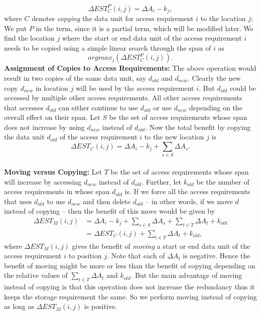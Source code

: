 \[ 
\Delta EST_C^P(i,j) = \Delta A_i - k_j, 
\]
where $C$ denotes {\it copying} the data unit for access requirement $i$ to the location $j$; We put $P$ in the term, since it is a partial term, which will be modified later. We find the location $j$ where the start or end data unit of the access requirement $i$ needs to be copied  using a simple linear search through the span of $i$ as
\[
argmax_j(\Delta EST_C^P(i,j)).
\]
{\bf Assignment of Copies to Access Requirements:} The above operation would
result in two copies of the same data unit, say $d_{old}$ and $d_{new}$.
Clearly the new copy $d_{new}$ in location $j$ will be used by the access
requirement $i$.  But $d_{old}$ could be accessed by multiple other access
requirements. All other access requirements that accesses $d_{old}$ can either
continue to use $d_{old}$ or use $d_{new}$ depending on the overall effect on
their span. Let $S$ be the set of access requirements whose span does not
increase by using $d_{new}$ instead of $d_{old}$. Now the total benefit by
copying the data unit $d_{old}$ of the access requirement $i$ to the new
location $j$ is
\begin{equation}
\Delta EST_C(i,j) = \Delta A_i - k_j + \sum_{s\in S}\Delta{A_s}.
\label{eq:copyingcost}
\end{equation}
\\
{\bf Moving versus Copying:} Let $T$ be the set of access requirements whose
span will increase by accessing $d_{new}$ instead of $d_{old}$. Further, let
$k_{old}$ be the number of access requirements in whose span $d_{old}$ is. If
we force all the access requirements that uses $d_{old}$ to use $d_{new}$ and
then delete $d_{old}$ -- in other words, if we move $d$ instead of copying --
then the benefit of this move would be given by
\[
\begin{split}
 \Delta EST_M(i,j) & = \Delta A_i - k_j + \sum_{s\in S}\Delta{A_s} + \sum_{t\in
T}\Delta{A_t} + k_{old} \\
		&= \Delta EST_C(i,j) + \sum_{t\in T}\Delta{A_t} + k_{old},
\end{split}
\]
where $\Delta EST_M(i,j)$ gives the benefit of {\it moving} a start or end data unit of the access requirement $i$ to position $j$. Note that each of $\Delta A_t$ is negative. Hence the benefit of moving might be more or less than the benefit of copying depending on the relative values of $\sum_{t\in T}\Delta{A_t}$ and $k_{old}$. But the main advantage of moving instead of copying is that this operation does not increase the redundancy thus it keeps the storage requirement the same. So we perform moving instead of copying as long as $\Delta EST_M(i,j)$ is positive.\\
